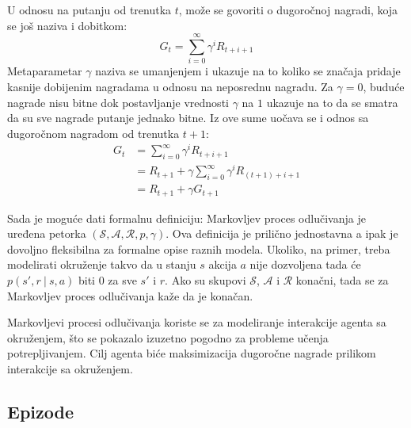 U odnosu na putanju od trenutka $t$, može se govoriti o dugoročnoj nagradi, koja se još naziva i dobitkom:
\begin{equation}
\label{eq:dug_suma}
	G_t = \sum_{i=0}^{\infty} \gamma^iR_{t+i+1}
\end{equation}
Metaparametar $\gamma$ naziva se umanjenjem i ukazuje na to koliko se značaja pridaje kasnije dobijenim nagradama u odnosu na neposrednu nagradu. Za $\gamma = 0$, buduće nagrade nisu bitne dok postavljanje vrednosti $\gamma$ na $1$ ukazuje na to da se smatra da su sve nagrade putanje jednako bitne. Iz ove sume uočava se i odnos sa dugoročnom nagradom od trenutka $t+1$:
\begin{equation}
	\begin{aligned}
		G_t &= \sum_{i=0}^{\infty} \gamma^iR_{t+i+1} \\
        	&= R_{t+1} + \gamma\sum_{i=0}^{\infty} \gamma^iR_{(t+1)+i+1} \\
        	&=R_{t+1} + \gamma G_{t+1}
	\end{aligned}
\end{equation}
\par 
Sada je moguće dati formalnu definiciju: Markovljev proces odlučivanja je uređena petorka $(\mathcal{S}, \mathcal{A}, \mathcal{R}, p, \gamma)$. Ova definicija je prilično jednostavna a ipak je dovoljno fleksibilna za formalne opise raznih modela. Ukoliko, na primer, treba modelirati okruženje takvo da u stanju $s$ akcija $a$ nije dozvoljena tada će $p(s', r ~|~ s, a)$ biti $0$ za sve $s'$ i $r$. Ako su skupovi $\mathcal{S}$, $\mathcal{A}$ i $\mathcal{R}$ konačni, tada se za Markovljev proces odlučivanja kaže da je konačan.
\par 
Markovljevi procesi odlučivanja koriste se za modeliranje interakcije agenta sa okruženjem, što se pokazalo izuzetno pogodno za probleme učenja potrepljivanjem. Cilj agenta biće maksimizacija dugoročne nagrade prilikom interakcije sa okruženjem.


\subsection{Epizode}

